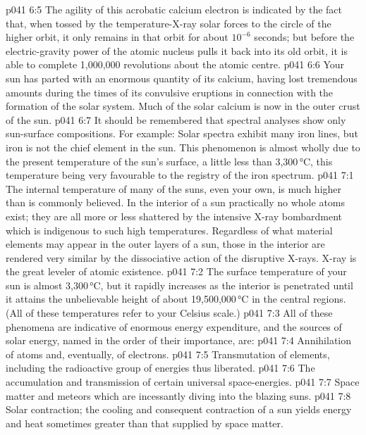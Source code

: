 \vs p041 6:5 The agility of this acrobatic calcium electron is indicated by the fact that, when tossed by the temperature\hyp{}X\hyp{}ray solar forces to the circle of the higher orbit, it only remains in that orbit for about $10^{-6}$ seconds; but before the electric\hyp{}gravity power of the atomic nucleus pulls it back into its old orbit, it is able to complete 1,000,000 revolutions about the atomic centre.
\vs p041 6:6 \pc Your sun has parted with an enormous quantity of its calcium, having lost tremendous amounts during the times of its convulsive eruptions in connection with the formation of the solar system. Much of the solar calcium is now in the outer crust of the sun.
\vs p041 6:7 \pc It should be remembered that spectral analyses show only sun\hyp{}surface compositions. For example: Solar spectra exhibit many iron lines, but iron is not the chief element in the sun. This phenomenon is almost wholly due to the present temperature of the sun’s surface, a little less than 3,300\,°C, this temperature being very favourable to the registry of the iron spectrum.
\vs p041 7:1 The internal temperature of many of the suns, even your own, is much higher than is commonly believed. In the interior of a sun practically no whole atoms exist; they are all more or less shattered by the intensive X\hyp{}ray bombardment which is indigenous to such high temperatures. Regardless of what material elements may appear in the outer layers of a sun, those in the interior are rendered very similar by the dissociative action of the disruptive X\hyp{}rays. X\hyp{}ray is the great leveler of atomic existence.
\vs p041 7:2 The surface temperature of your sun is almost 3,300\,°C, but it rapidly increases as the interior is penetrated until it attains the unbelievable height of about 19,500,000\,°C in the central regions. (All of these temperatures refer to your Celsius scale.)
\vs p041 7:3 \pc All of these phenomena are indicative of enormous energy expenditure, and the sources of solar energy, named in the order of their importance, are:
\vs p041 7:4 \bibnobreakspace Annihilation of atoms and, eventually, of electrons.
\vs p041 7:5 \bibnobreakspace Transmutation of elements, including the radioactive group of energies thus liberated.
\vs p041 7:6 \bibnobreakspace The accumulation and transmission of certain universal space\hyp{}energies.
\vs p041 7:7 \bibnobreakspace Space matter and meteors which are incessantly diving into the blazing suns.
\vs p041 7:8 \bibnobreakspace Solar contraction; the cooling and consequent contraction of a sun yields energy and heat sometimes greater than that supplied by space matter.
